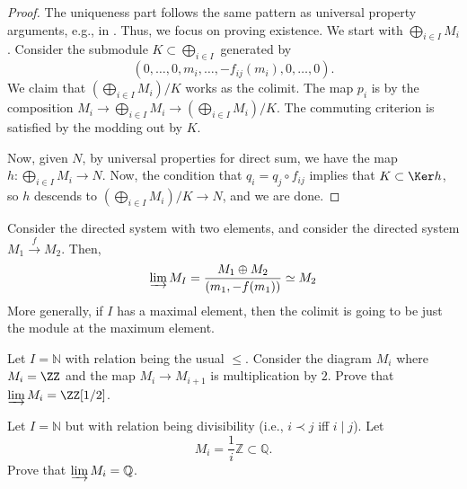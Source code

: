 \begin{proof}
    The uniqueness part follows the same pattern
    as universal property arguments,
    e.g., in .
    Thus, we focus on proving existence.
    We start with $\bigoplus_{i\in I} M_i$.
    Consider the submodule $K\subset\bigoplus_{i\in I}$
    generated by
    $$(0,\dots,0,m_i,\dots,-f_{ij}(m_i),0,\dots,0).$$
    We claim that $\left(\bigoplus_{i\in I}M_i\right) / K$ works
    as the colimit.
    The map $p_i$ is by the composition
    $M_i\to \bigoplus_{i\in I} M_i\to \left(\bigoplus_{i\in I} M_i\right)/K$.
    The commuting criterion is satisfied by
    the modding out by $K$.

    Now, given $N$, by universal properties for direct sum,
    we have the map $h : \bigoplus_{i\in I} M_i\to N$.
    Now, the condition that
    $q_i=q_j\circ f_{ij}$
    implies that $K\subset\Ker h$,
    so $h$ descends to $\left(\bigoplus_{i\in I} M_i\right)/K\to N$,
    and we are done.
\end{proof}
\begin{example}
    Consider the directed system with two elements,
    and consider the directed system $M_1\stackrel f\to M_2$.
    Then,
    $$\varinjlim M_I = \frac{M_1\oplus M_2}{(m_1, -f(m_1))}
     \simeq M_2$$
     More generally, if $I$ has a maximal element,
     then the colimit is going to be just
     the module at the maximum element.
\end{example}
\begin{exercise}
    \label{ex:rational}
    \begin{alphenum}
    \item Let $I=\mathbb N$ with relation being the usual
    $\leq$.
    Consider the diagram $M_i$ where $M_i=\ZZ$
    and the map $M_i\to M_{i+1}$ is multiplication by $2$.
    Prove that $\varinjlim M_i = \ZZ[1/2]$.
    \item Let $I=\mathbb N$ but with relation being
    divisibility (i.e., $i\prec j$ iff $i\mid j$).
    Let
    $$M_i = \frac 1i \mathbb Z\subset\mathbb Q.$$
    Prove that $\varinjlim M_i = \mathbb Q$.
    \end{alphenum}
\end{exercise}
